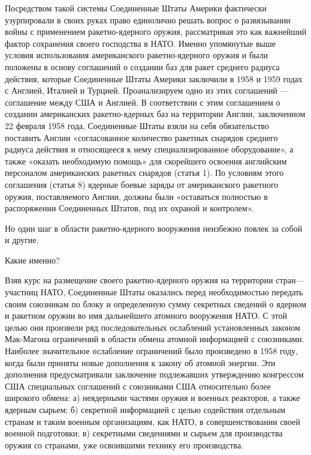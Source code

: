 \documentclass[12pt, a4paper, openany]{book}
\begin{document}
	Посредством такой системы Соединенные Штаты Америки фактически узурпировали в своих руках право единолично решать вопрос о развязывании войны с применением ракетно-ядерного оружия, рассматривая это как важнейший фактор сохранения своего господства в НАТО. Именно упомянутые выше условия использования американского ракетно-ядерного оружия и были положены в основу соглашений о создании баз для ракет среднего радиуса действия, которые Соединенные Штаты Америки заключили в 1958 и 1959 годах с Англией, Италией и Турцией. Проанализируем одно из этих соглашений — соглашение между США и Англией. В соответствии с этим соглашением о создании американских ракетно-ядерных баз на территории Англии, заключенном 22 февраля 1958 года, Соединенные Штаты взяли на себя обязательство поставить Англии «согласованное количество ракетных снарядов среднего радиуса действия и относящееся к нему специализированное оборудование», а также «оказать необходимую помощь» для скорейшего освоения английским персоналом американских ракетных снарядов (статья 1). По условиям этого соглашения (статья 8) ядерные боевые заряды от американского ракетного оружия, поставляемого Англии, должны были «оставаться полностью в распоряжении Соединенных Штатов, под их охраной и контролем».
	
	Но один шаг в области ракетно-ядерного вооружения неизбежно повлек за собой и другие.
	
	Какие именно?
	
	Взяв курс на размещение своего ракетно-ядерного оружия на территории стран—участниц НАТО, Соединенные Штаты оказались перед необходимостью передать своим союзникам по блоку и определенную сумму секретных сведений о ядерном и ракетном оружии во имя дальнейшего атомного вооружения НАТО. С этой целью они произвели ряд последовательных ослаблений установленных законом Мак-Магона ограничений в области обмена атомной информацией с союзниками. Наиболее значительное ослабление ограничений было произведено в 1958 году, когда были приняты новые дополнения к закону об атомной энергии. Эти дополнения предусматривали заключение подлежавших утверждению конгрессом США специальных соглашений с союзниками США относительно более широкого обмена: а) неядерными частями оружия и военных реакторов, а также ядерным сырьем; б) секретной информацией с целью содействия отдельным странам и таким военным организациям, как НАТО, в совершенствовании своей военной подготовки; в) секретными сведениями и сырьем для производства оружия со странами, уже освоившими технику его производства.
	
\end{document}
